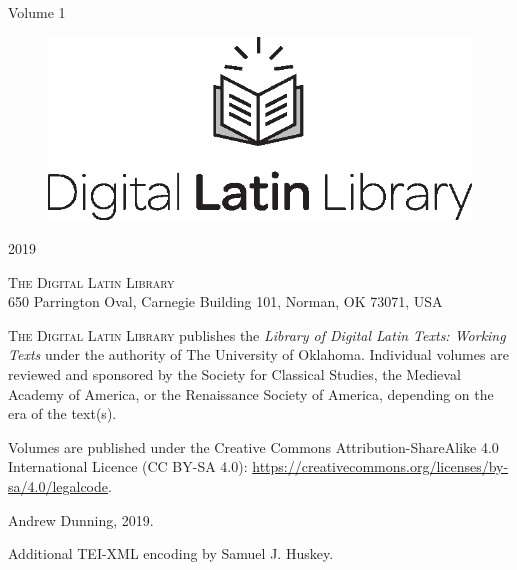 \documentclass[a4paper, 11pt, oneside]{book} %
\begin{document}
\begin{titlepage}
\vspace{2\baselineskip} %
{\large Volume 1}\\
\vfill %


\begin{figure}[h] %
\includegraphics[scale=0.60]{DLL} %
\centering %
\end{figure}

{\normalsize 2019}
\end{titlepage}
\thispagestyle{empty}
\vspace*{\baselineskip} %
\vspace{12\baselineskip} %
\centering
{\scshape \LARGE The Digital Latin Library}\\650 Parrington Oval, Carnegie Building 101, Norman, OK  73071, USA
\vspace{\baselineskip} %

\flushleft
\small
{\scshape The Digital Latin Library} publishes the \textit{Library of Digital Latin Texts: Working Texts} under the authority of The University of Oklahoma. Individual volumes are reviewed and sponsored by the Society for Classical Studies, the Medieval Academy of America, or the Renaissance Society of America, depending on the era of the text(s).

\vspace{2\baselineskip} %

Volumes are published under the Creative
            Commons Attribution-ShareAlike 4.0 International Licence (CC BY-SA 4.0): \url{https://creativecommons.org/licenses/by-sa/4.0/legalcode}.

\vspace{2\baselineskip} %

\textcopyright  Andrew Dunning, 2019.

\vspace{2\baselineskip} %

Additional TEI-XML encoding by Samuel J. Huskey.
\end{document}
